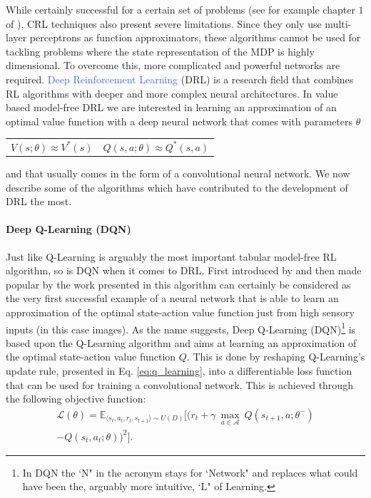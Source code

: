 While certainly successful for a certain set of problems (see for example chapter $1$ of \cite{sabatelli2017learning}), CRL techniques also present severe limitations. Since they only use multi-layer perceptrons as function approximators, these algorithms cannot be used for tackling problems where the state representation of the MDP is highly dimensional. To overcome this, more complicated and powerful networks are required. \textcolor{RoyalBlue}{Deep Reinforcement Learning} (DRL) \cite{arulkumaran2017deep, li2017deep, franccois2018introduction} is a research field that combines RL algorithms with deeper and more complex neural architectures. In value based model-free DRL we are interested in learning an approximation of an optimal value function with a deep neural network that comes with parameters $\theta$
\noindent
\begin{tabularx}{\linewidth}{@{}XX@{}}
\begin{equation}
	  V(s;\theta)\approx V^{*}(s)
	  \label{eq:v_approx}
  \end{equation}
&
\begin{equation}  
	Q(s,a;\theta)\approx Q^{*}(s,a)
	\label{eq:q_approx}
  \end{equation}
\end{tabularx}
and that usually comes in the form of a convolutional neural network. We now describe some of the algorithms which have contributed to the development of DRL the most. 


\paragraph{\textbf{\uppercase{D}eep \uppercase{Q}-\uppercase{L}earning (\uppercase{DQN})}} Just like Q-Learning is arguably the most important tabular model-free RL algorithm, so is DQN when it comes to DRL. First introduced by \citet{mnih2013playing} and then made popular by the work presented in \cite{mnih2015human} this algorithm can certainly be considered as the very first successful example of a neural network that is able to learn an approximation of the optimal state-action value function just from high sensory inputs (in this case images). As the name suggests, Deep Q-Learning (DQN)\footnote{In DQN the `N" in the acronym stays for `Network" and replaces what could have been the, arguably more intuitive, `L" of Learning.} is based upon the Q-Learning algorithm and aims at learning an approximation of the optimal state-action value function $Q$. This is done by reshaping Q-Learning's update rule, presented in Eq. \ref{eq:q_learning}, into a differentiable loss function that can be used for training a convolutional network. This is achieved through the following objective function:
\begin{multline}
	\mathcal{L}(\theta) = \mathds{E}_{\langle s_{t},a_{t},r_{t},s_{t+1}\rangle\sim U(D)} \bigg[\big(r_{t} + \gamma \: \underset{a\in \mathcal{A}}{\max}\: Q(s_{t+1}, a; \theta^{-}) \\ - Q(s_{t}, a_{t}; \theta)\big)^{2}\bigg].
\label{eq:dqn}
\end{multline}


